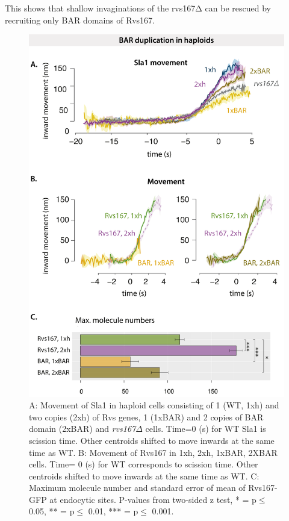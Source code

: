 This shows that shallow invaginations of the rvs167Δ can be rescued by recruiting only BAR domains of Rvs167.


		\begin{figure}[H]
		\vspace*{-2 mm}
		\includegraphics[width=21cm,height=21 cm,keepaspectratio]{figures/results_final/scaffolding_overlaid3}
		\caption [Overexpression of the Rvs BAR domain]
		{A: Movement of Sla1 in haploid cells consisting of 1 (WT, 1xh) and two copies (2xh) of Rvs genes, 1 (1xBAR) and 2 copies of BAR domain (2xBAR) and  \textit{rvs167$\Delta$} cells. Time=0 (s) for WT Sla1 is scission time. Other centroids shifted to move inwards at the same time as WT.
		B: Movement of Rvs167 in 1xh, 2xh, 1xBAR, 2XBAR cells. Time= 0 (s) for WT corresponds to scission time. Other centroids shifted to move inwards at the same time as WT.
		C: Maximum molecule number and standard error of mean of Rvs167-GFP at endocytic sites. P-values from two-sided z test, * = p$\leq$ 0.05, ** = p$\leq$ 0.01, *** = p$\leq$ 0.001. }
		\label{fig_scaffold}
		\end{figure}


